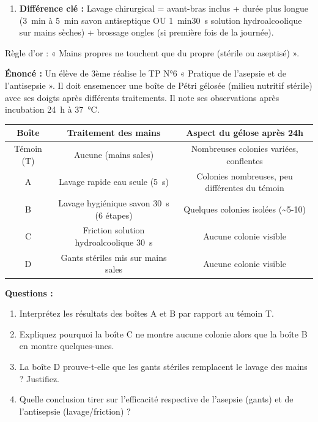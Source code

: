 \documentclass[11pt]{article}
\newcommand{\cle}[1]{{\popxbold\color{popdark}#1}}
\begin{document}
\begin{methode}
\begin{enumerate}
        \item \textbf{Différence clé :} Lavage chirurgical = avant-bras inclus + durée plus longue (\SI{3}{\minute} à \SI{5}{\minute} savon antiseptique OU \SI{1}{\minute}\SI{30}{\second} solution hydroalcoolique sur mains sèches) + brossage ongles (si première fois de la journée).
    \end{enumerate}
    \cle{Règle d'or} : « Mains propres ne touchent que du propre (stérile ou aseptisé) ».
\end{methode}

\begin{exoresolu}
    \textbf{Énoncé :} Un élève de 3ème réalise le TP N°6 « Pratique de l'asepsie et de l'antisepsie ». Il doit ensemencer une boîte de Pétri gélosée (milieu nutritif stérile) avec ses doigts après différents traitements. Il note ses observations après incubation \SI{24}{\hour} à \SI{37}{\celsius}.
    \begin{center}
    \begin{tabular}{|c|c|c|}\hline
    \rowcolor{popblueL} \textbf{Boîte} & \textbf{Traitement des mains} & \textbf{Aspect du gélose après 24h} \\ \hline
    Témoin (T) & Aucune (mains sales) & Nombreuses colonies variées, conflentes \\ \hline
    A & Lavage rapide eau seule (\SI{5}{\second}) & Colonies nombreuses, peu différentes du témoin \\ \hline
    B & Lavage hygiénique savon \SI{30}{\second} (6 étapes) & Quelques colonies isolées (\textasciitilde 5-10) \\ \hline
    C & Friction solution hydroalcoolique \SI{30}{\second} & Aucune colonie visible \\ \hline
    D & Gants stériles mis sur mains sales & Aucune colonie visible \\ \hline
    \end{tabular}
    \end{center}
    \textbf{Questions :}
    \begin{enumerate}
        \item Interprétez les résultats des boîtes A et B par rapport au témoin T.
        \item Expliquez pourquoi la boîte C ne montre aucune colonie alors que la boîte B en montre quelques-unes.
        \item La boîte D prouve-t-elle que les gants stériles remplacent le lavage des mains ? Justifiez.
        \item Quelle conclusion tirer sur l'efficacité respective de l'asepsie (gants) et de l'antisepsie (lavage/friction) ?

\end{enumerate}
\end{exoresolu}
\end{document}
